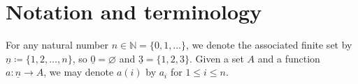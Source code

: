 \documentclass[11pt, article, oneside]{memoir}
\theoremstyle{plain}
\theoremstyle{definition}
\theoremstyle{remark}
\newcommand{\NN}{\mathbb{N}}
\newcommand{\ul}[1]{\underline{#1}}
\newcommand{\stodo}[2][]{\todo[color=red!30, #1]{#2}}
\newcommand\el{\mathsf{elGr}}
\newcommand\g{\mathcal G}
\begin{document}
%
%

\section{Notation and terminology}

For any natural number $n\in\NN=\{0,1,\ldots\}$, we denote the associated finite set by $\ul{n}\coloneqq\{1,2,\ldots,n\}$, so $\ul{0}=\varnothing$ and $\ul{3}=\{1,2,3\}$. Given a set $A$ and a function $a\colon\ul{n}\to A$, we may denote $a(i)$ by $a_i$ for $1\leq i\leq n$.
\end{document}
